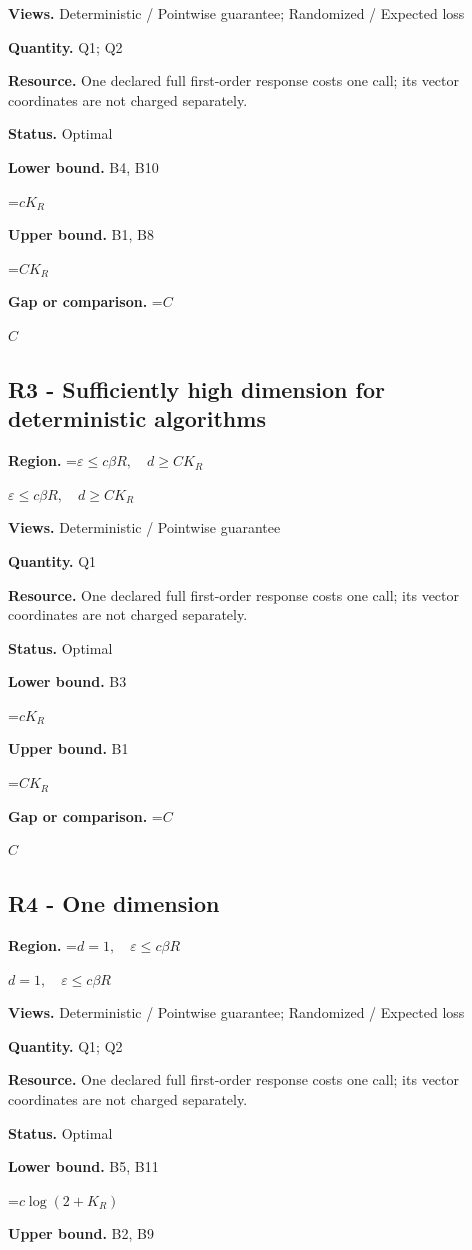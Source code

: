 \documentclass[10pt,a4paper]{article}
\newcommand{\AtlasMath}[1]{\par\begingroup\centering\setbox0=\hbox{$\displaystyle #1$}\ifdim\wd0>1.4\linewidth\typeout{ATLAS WIDE FORMULA: \the\wd0}\fi\ifdim\wd0>\linewidth\resizebox{\linewidth}{!}{\box0}\else\box0\fi\par\endgroup}
\newcommand{\AtlasInlineMath}[1]{\begingroup\setbox0=\hbox{$#1$}\ifdim\wd0>.4\linewidth\endgroup\AtlasMath{#1}\else\endgroup$#1$\fi}
\begin{document}
\textbf{Views.} Deterministic / Pointwise guarantee; Randomized / Expected loss

\textbf{Quantity.} Q1; Q2

\textbf{Resource.} One declared full first-order response costs one call; its vector coordinates are not charged separately.

\textbf{Status.} Optimal

\textbf{Lower bound.} B4, B10

\AtlasMath{cK_R}
\textbf{Upper bound.} B1, B8

\AtlasMath{CK_R}
\textbf{Gap or comparison.} \AtlasInlineMath{C}

\subsection{R3 - Sufficiently high dimension for deterministic algorithms}
\textbf{Region.} \AtlasInlineMath{\varepsilon\le c\beta R,\quad d\ge CK_R}

\textbf{Views.} Deterministic / Pointwise guarantee

\textbf{Quantity.} Q1

\textbf{Resource.} One declared full first-order response costs one call; its vector coordinates are not charged separately.

\textbf{Status.} Optimal

\textbf{Lower bound.} B3

\AtlasMath{cK_R}
\textbf{Upper bound.} B1

\AtlasMath{CK_R}
\textbf{Gap or comparison.} \AtlasInlineMath{C}

\subsection{R4 - One dimension}
\textbf{Region.} \AtlasInlineMath{d=1,\quad\varepsilon\le c\beta R}

\textbf{Views.} Deterministic / Pointwise guarantee; Randomized / Expected loss

\textbf{Quantity.} Q1; Q2

\textbf{Resource.} One declared full first-order response costs one call; its vector coordinates are not charged separately.

\textbf{Status.} Optimal

\textbf{Lower bound.} B5, B11

\AtlasMath{c\log(2+K_R)}
\textbf{Upper bound.} B2, B9
\end{document}
